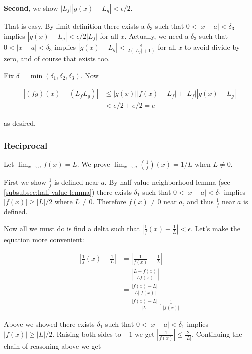 \vs

\textbf{Second}, we show $|L_f||g(x)-L_g|<\epsilon/2$.

\vs

That is easy. By limit definition there exists a $\delta_3$ such that
$0<|x-a|<\delta_3$ implies $|g(x)-L_g|<\epsilon/2|L_f|$ for all $x$. Actually, we
need a $\delta_3$ such that $0<|x-a|<\delta_3$ implies
$|g(x)-L_g|<\frac{\epsilon}{2(|L_f|+1)}$ for all $x$ to avoid divide by zero, and of
course that exists too.

\vs

Fix $\delta=\min(\delta_1, \delta_2, \delta_3)$. Now

\begin{align*}
    |(fg)(x)-(L_fL_g)|&\leq |g(x)||f(x)-L_f|+|L_f||g(x)-L_g|\\
    &<e/2+e/2=e
\end{align*}

as desired.

\subsubsection*{Reciprocal}

Let $\lim_{x\to a}f(x)=L$. We prove $\lim_{x\to a}\left(\frac{1}{f}\right)(x)=1/L$ when $L\neq 0$.

\vs

First we show $\frac{1}{f}$ is defined near $a$. By half-value
neighborhood lemma (see \ref{subsubsec:half-value-lemma}) there exists
$\delta_{1}$ such that $0<|x-a|<\delta_{1}$ implies $|f(x)|\geq |L|/2$ where
$L\neq0$. Therefore $f(x)\neq 0$ near $a$, and thus $\frac{1}{f}$ near
$a$ is defined.

\vs


Now all we must do is find a delta such that
$\left|\frac{1}{f}(x)-\frac{1}{L}\right|<\epsilon$. Let's make the equation
more convenient:

\begin{align*}
  \left|\frac{1}{f}(x)-\frac{1}{L}\right|&=\left|\frac{1}{f(x)}-\frac{1}{L}\right|\\
                                         &=\left|\frac{L-f(x)}{Lf(x)}\right|\\
                                         &=\frac{|f(x)-L|}{|L||f(x)|}\\
                                         &=\frac{|f(x)-L|}{|L|}\cdot\frac{1}{|f(x)|}
\end{align*}

Above we showed there exists $\delta_{1}$ such that
$0<|x-a|<\delta_{1}$ implies $|f(x)|\geq |L|/2$. Raising both sides to
$-1$ we get $|\frac{1}{f(x)}|\leq \frac{2}{|L|}$. Continuing the chain of
reasoning above we get

